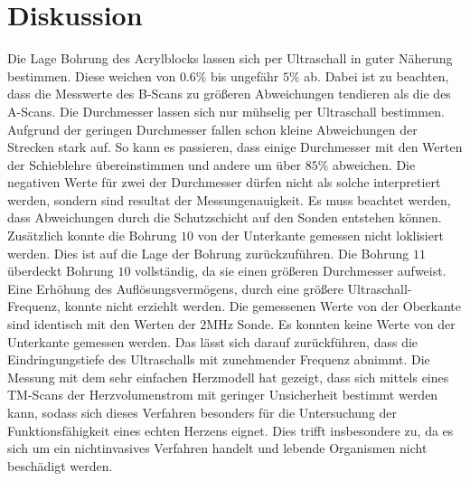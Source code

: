 \section{Diskussion}
\label{sec:Diskussion}
Die Lage Bohrung des Acrylblocks lassen sich per Ultraschall in guter Näherung bestimmen.
Diese weichen von $0.6\%$ bis ungefähr $5\%$ ab.
Dabei ist zu beachten, dass die Messwerte des B-Scans zu größeren Abweichungen tendieren als die des A-Scans.
Die Durchmesser lassen sich nur mühselig per Ultraschall bestimmen.
Aufgrund der geringen Durchmesser fallen schon kleine Abweichungen der Strecken stark auf.
So kann es passieren, dass einige Durchmesser mit den Werten der Schieblehre übereinstimmen und andere um über $85\%$ abweichen.
Die negativen Werte für zwei der Durchmesser dürfen nicht als solche interpretiert werden, sondern sind resultat der Messungenauigkeit.
Es muss beachtet werden, dass Abweichungen durch die Schutzschicht auf den Sonden entstehen können.
Zusätzlich konnte die Bohrung $10$ von der Unterkante gemessen nicht loklisiert werden.
Dies ist auf die Lage der Bohrung zurückzuführen.
Die Bohrung $11$ überdeckt Bohrung $10$ vollständig, da sie einen größeren Durchmesser aufweist.
Eine Erhöhung des Auflösungsvermögens, durch eine größere Ultraschall-Frequenz, konnte nicht erziehlt werden.
Die gemessenen Werte von der Oberkante sind identisch mit den Werten der $2\si{\mega\hertz}$ Sonde.
Es konnten keine Werte von der Unterkante gemessen werden.
Das lässt sich darauf zurückführen, dass die Eindringungstiefe des Ultraschalls mit zunehmender Frequenz abnimmt.
\noindent Die Messung mit dem sehr einfachen Herzmodell hat gezeigt, dass sich mittels eines TM-Scans der Herzvolumenstrom mit geringer Unsicherheit
bestimmt werden kann, sodass sich dieses Verfahren besonders für die Untersuchung der Funktionsfähigkeit eines echten Herzens eignet.
Dies trifft insbesondere zu, da es sich um ein nichtinvasives Verfahren handelt und lebende Organismen nicht beschädigt werden.
